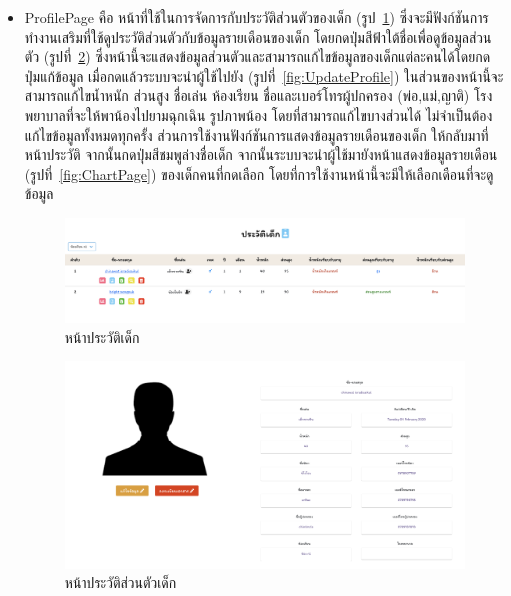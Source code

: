 \begin{itemize}
  
  \item  ProfilePage คือ หน้าที่ใช้ในการจัดการกับประวัติส่วนตัวของเด็ก (รูป~\ref{fig:Profile}) ซึ่งจะมีฟังก์ชันการทำงานเสริมที่ใช้ดูประวัติส่วนตัวกับข้อมูลรายเดือนของเด็ก
  โดยกดปุ่มสีฟ้าใต้ชื่อเพื่อดูข้อมูลส่วนตัว (รูปที่~\ref{fig:ProfileTwo}) ซึ่งหน้านี้จะแสดงข้อมูลส่วนตัวและสามารถแก้ไขข้อมูลของเด็กแต่ละคนได้โดยกดปุ่มแก้ข้อมูล เมื่อกดแล้วระบบจะนำผู้ใช้ไปยัง (รูปที่~\ref{fig:UpdateProfile}) 
  ในส่วนของหน้านี้จะสามารถแก้ไขน้ำหนัก ส่วนสูง ชื่อเล่น ห้องเรียน ชื่อและเบอร์โทรผู้ปกครอง (พ่อ,แม่,ญาติ) โรงพยาบาลที่จะให้พาน้องไปยามฉุกเฉิน รูปภาพน้อง 
  โดยที่สามารถแก้ไขบางส่วนได้ ไม่จำเป็นต้องแก้ไขข้อมูลทั้งหมดทุกครั้ง ส่วนการใช้งานฟังก์ชันการแสดงข้อมูลรายเดือนของเด็ก ให้กลับมาที่หน้าประวัติ จากนั้นกดปุ่มสีชมพูล่างชื่อเด็ก
  จากนั้นระบบจะนำผู้ใช้มายังหน้าแสดงข้อมูลรายเดือน (รูปที่~\ref{fig:ChartPage}) ของเด็กคนที่กดเลือก โดยที่การใช้งานหน้านี้จะมีให้เลือกเดือนที่จะดูข้อมูล 

  
    \begin{figure}
      \begin{center}
      \includegraphics[width=\linewidth]{images/Profile.png}
      \end{center}
      \caption[หน้าประวัติเด็ก]{หน้าประวัติเด็ก}
      \label{fig:Profile}
    \end{figure}
  
  
  
    \begin{figure}
      \begin{center}
      \includegraphics[width=\linewidth]{images/ProfileInfo.png}
      \end{center}
      \caption[หน้าประวัติส่วนตัวเด็ก]{หน้าประวัติส่วนตัวเด็ก}
      \label{fig:ProfileTwo}
    \end{figure}
  

\end{itemize}
